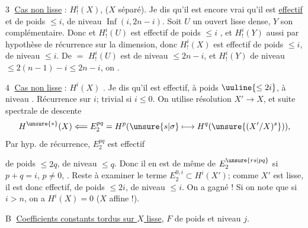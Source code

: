 
\textcircled{3} \uline{Cas non lisse} : $H^i_!(X)$, ($X$ séparé). Je dis qu'il est encore vrai qu'il est \uline{effectif} et de poids $\le i$, de niveau $\operatorname{Inf}(i,2n-i)$.
Soit $U$ un ouvert lisse dense, $Y$ son complémentaire.
Donc
et $H^i_!(U)$  est effectif de poids $\le i$ , et $H^i_!(Y)$ aussi par hypothèse de récurrence sur la dimension, donc $H^i_!(X)$ est effectif de poids $\le i$, de niveau $\le i$. De \(=\) $H^i_!(U)$ est de niveau $\le2n-i$, et $H^i_!(Y)$ de niveau $\le2(n-1)-i\le2n-i$, on .

\textcircled{4} \uline{Cas non lisse} : $H^i(X)$ . Je dis qu'il est effectif, à poids $\uuline{\le2i}$, à niveau  .
Récurrence sur $i$; trivial si $i\le0$. On utilise résolution $X'\to X$, et suite spectrale de descente
\[
H^{\unsure{*}}(X)\Longleftarrow E^{pq}_2=H^p(\unsure{s|\sigma}\longmapsto H^q(\unsure{(X'/X)^s})),
\]
  Par hyp. de récurrence,   $E^{pq}_2$ est effectif

de  poids $\le2q$, de niveau $\le q$. Donc il en est de même de $E^{\unsure{rs|pq}}_2$ si $p+q=i$, $p\ne0$, . Reste à examiner le terme $E^{0,i}_2\subset H^i(X')$; comme $X'$ est lisse, il est donc effectif, de poids $\le2i$, de niveau $\le i$. On a gagné ! Si on note que si $i>n$, on a $H^i(X)=0$ ($X$ affine !).


\textcircled{B} \uline{Coefficients constants tordus sur $X$ lisse},  $F$  de poids et niveau $j$.

